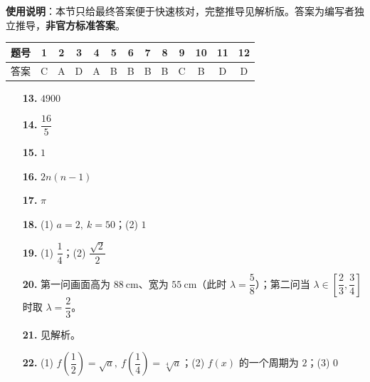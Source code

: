 
\begin{gknotice}
\textbf{使用说明}：本节只给最终答案便于快速核对，完整推导见解析版。答案为编写者独立推导，\textbf{非官方标准答案}。
\end{gknotice}

\begin{center}\begin{tabular}{ccccccccccccc}
\toprule
题号 & 1 & 2 & 3 & 4 & 5 & 6 & 7 & 8 & 9 & 10 & 11 & 12 \\
\midrule
答案 & C & A & D & A & B & B & B & B & C & B & D & D \\
\bottomrule
\end{tabular}\end{center}

\begin{itemize}[leftmargin=2.6em]
  \item[\textbf{13.}] $4900$
  \item[\textbf{14.}] $\dfrac{16}{5}$
  \item[\textbf{15.}] $1$
  \item[\textbf{16.}] $2n(n-1)$
\end{itemize}

\begin{itemize}[leftmargin=2.6em]
  \item[\textbf{17.}] $\pi$
  \item[\textbf{18.}] (1) $a=2,\ k=50$；(2) $1$
  \item[\textbf{19.}] (1) $\dfrac14$；(2) $\dfrac{\sqrt2}{2}$
  \item[\textbf{20.}] 第一问画面高为 $88\ \mathrm{cm}$、宽为 $55\ \mathrm{cm}$（此时 $\lambda=\dfrac58$）；第二问当 $\lambda\in\left[\dfrac23,\dfrac34\right]$ 时取 $\lambda=\dfrac23$。
  \item[\textbf{21.}] 见解析。
  \item[\textbf{22.}] (1) $f\left(\dfrac12\right)=\sqrt a,\ f\left(\dfrac14\right)=\sqrt[4]a$；(2) $f(x)$ 的一个周期为 $2$；(3) $0$
\end{itemize}
